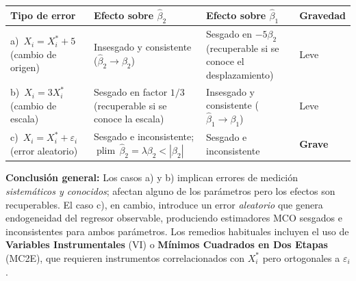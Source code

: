 \documentclass[12pt, letterpaper]{article}
\newcommand{\plim}{\operatorname{plim}}
\begin{document}
\begin{center}
\renewcommand{\arraystretch}{1.4}
\small
\begin{tabular}{p{3.6cm} p{3.5cm} p{3.5cm} p{3.0cm}}
\toprule
\textbf{Tipo de error} & \textbf{Efecto sobre $\hat{\beta}_2$} & \textbf{Efecto sobre $\hat{\beta}_1$} & \textbf{Gravedad} \\
\midrule
a)\ $X_i = X_i^* + 5$ \newline (cambio de origen)
  & Insesgado y consistente \newline ($\hat{\beta}_2 \to \beta_2$)
  & Sesgado en $-5\beta_2$ \newline (recuperable si se conoce el desplazamiento)
  & Leve \\
\midrule
b)\ $X_i = 3X_i^*$ \newline (cambio de escala)
  & Sesgado en factor $1/3$ \newline (recuperable si se conoce la escala)
  & Insesgado y consistente \newline ($\hat{\beta}_1 \to \beta_1$)
  & Leve \\
\midrule
c)\ $X_i = X_i^* + \varepsilon_i$ \newline (error aleatorio)
  & Sesgado e inconsistente; $\plim\,\hat{\beta}_2 = \lambda\beta_2 < |\beta_2|$
  & Sesgado e inconsistente
  & \textbf{Grave} \\
\bottomrule
\end{tabular}
\end{center}

\vspace{6pt}
\begin{clave}
  \textbf{Conclusión general:} Los casos a) y b) implican errores de
  medición \emph{sistemáticos y conocidos}; afectan alguno de los parámetros
  pero los efectos son recuperables. El caso c), en cambio, introduce un
  error \emph{aleatorio} que genera endogeneidad del regresor observable,
  produciendo estimadores MCO sesgados e inconsistentes para ambos parámetros.
  Los remedios habituales incluyen el uso de \textbf{Variables Instrumentales}
  (VI) o \textbf{Mínimos Cuadrados en Dos Etapas} (MC2E), que requieren
  instrumentos correlacionados con $X_i^*$ pero ortogonales a $\varepsilon_i$.
\end{clave}
\end{document}
